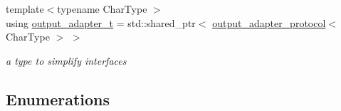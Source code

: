 \begin{DoxyCompactItemize}
\item 
{\footnotesize template$<$typename Char\+Type $>$ }\\using \mbox{\hyperlink{namespacenlohmann_1_1detail_a9b680ddfb58f27eb53a67229447fc556}{output\+\_\+adapter\+\_\+t}} = std\+::shared\+\_\+ptr$<$ \mbox{\hyperlink{structnlohmann_1_1detail_1_1output__adapter__protocol}{output\+\_\+adapter\+\_\+protocol}}$<$ Char\+Type $>$ $>$
\begin{DoxyCompactList}\small\item\em a type to simplify interfaces \end{DoxyCompactList}\end{DoxyCompactItemize}
\subsection*{Enumerations}
